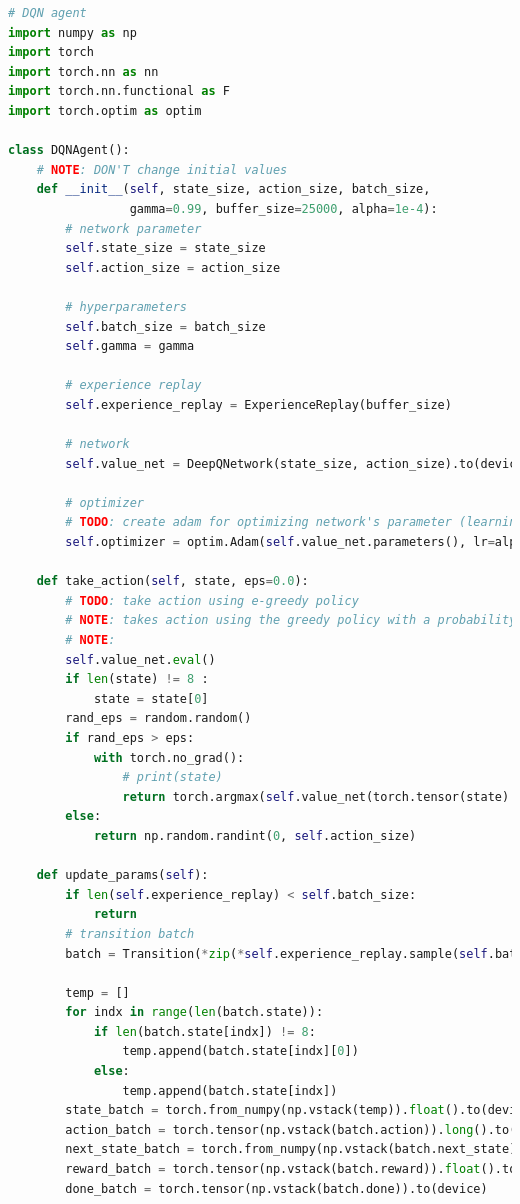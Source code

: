 \documentclass{article}
\begin{document}
\begin{LTR}
	\begin{lstlisting}[language=Python, caption=Agent Class]
# DQN agent
import numpy as np
import torch
import torch.nn as nn
import torch.nn.functional as F
import torch.optim as optim

class DQNAgent():
    # NOTE: DON'T change initial values
    def __init__(self, state_size, action_size, batch_size,
                 gamma=0.99, buffer_size=25000, alpha=1e-4):
        # network parameter
        self.state_size = state_size
        self.action_size = action_size

        # hyperparameters
        self.batch_size = batch_size
        self.gamma = gamma

        # experience replay
        self.experience_replay = ExperienceReplay(buffer_size)

        # network
        self.value_net = DeepQNetwork(state_size, action_size).to(device)

        # optimizer
        # TODO: create adam for optimizing network's parameter (learning rate=alpha)
        self.optimizer = optim.Adam(self.value_net.parameters(), lr=alpha)

    def take_action(self, state, eps=0.0):
        # TODO: take action using e-greedy policy
        # NOTE: takes action using the greedy policy with a probability of 1−𝜖 and a random action with a probability of 𝜖
        # NOTE:
        self.value_net.eval()
        if len(state) != 8 :
            state = state[0]
        rand_eps = random.random()
        if rand_eps > eps:
            with torch.no_grad():
                # print(state)
                return torch.argmax(self.value_net(torch.tensor(state).to(device))).detach().cpu().numpy()
        else:
            return np.random.randint(0, self.action_size)

    def update_params(self):
        if len(self.experience_replay) < self.batch_size:
            return
        # transition batch
        batch = Transition(*zip(*self.experience_replay.sample(self.batch_size)))

        temp = []
        for indx in range(len(batch.state)):
            if len(batch.state[indx]) != 8:
                temp.append(batch.state[indx][0])
            else:
                temp.append(batch.state[indx])
        state_batch = torch.from_numpy(np.vstack(temp)).float().to(device)  # [8, 8]
        action_batch = torch.tensor(np.vstack(batch.action)).long().to(device) # [8, 1]
        next_state_batch = torch.from_numpy(np.vstack(batch.next_state)).float().to(device) # [8, 8]
        reward_batch = torch.tensor(np.vstack(batch.reward)).float().to(device) # [8, 1]
        done_batch = torch.tensor(np.vstack(batch.done)).to(device)


\end{lstlisting}
\end{LTR}
\end{document}
